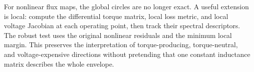 

For nonlinear flux maps, the global circles are no longer exact.  A useful
extension is local: compute the differential torque matrix, local loss metric,
and local voltage Jacobian at each operating point, then track their spectral
descriptors.  The robust test uses the original nonlinear residuals and the
minimum local margin.  This preserves the interpretation of torque-producing,
torque-neutral, and voltage-expensive directions without pretending that one
constant inductance matrix describes the whole envelope.

